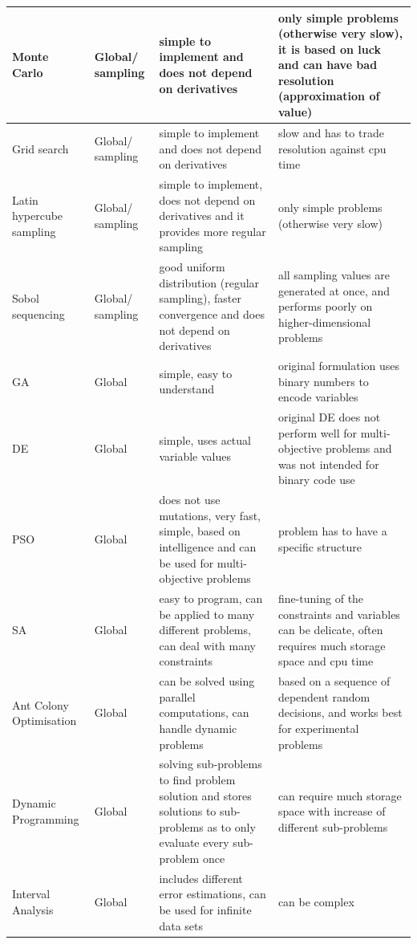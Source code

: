 \begin{longtable}{|p{2.5cm}|p{1.5cm}|p{6cm}|p{6cm}|}
Monte Carlo 	& Global/ sampling & simple to implement and does not depend on derivatives & only simple problems (otherwise very slow), it is based on luck and can have bad resolution (approximation of value) \\ \hline
Grid search 		& Global/ sampling & simple to implement and does not depend on derivatives & slow and has to trade resolution against cpu time \\ \hline
Latin hypercube sampling \cite{helton2003}		& Global/ sampling & simple to implement, does not depend on derivatives and it provides more regular sampling & only simple problems (otherwise very slow) \\ \hline
Sobol sequencing \cite{sobol1998}		& Global/ sampling & good uniform distribution (regular sampling), faster convergence and does not depend on derivatives  & all sampling values are generated at once, and performs poorly on higher-dimensional problems \\ \hline
\ac{GA}		& Global & simple, easy to understand & original formulation uses binary numbers to encode variables \\ \hline
\ac{DE} 		& Global & simple, uses actual variable values & original \ac{DE} does not perform well for multi-objective problems and was not intended for binary code use \cite{coello2007evolutionary} \\ \hline
\ac{PSO} \cite{selvi2010comparative}		& Global & does not use mutations, very fast, simple, based on intelligence and can be used for multi-objective problems  &  problem has to have a specific structure \\ \hline
\ac{SA} \cite{busetti2003simulated,ingber1993simulated} 		& Global &  easy to program, can be applied to many different problems, can deal with many constraints &  fine-tuning of the constraints and variables can be delicate, often requires much storage space and cpu time \\ \hline
Ant Colony Optimisation \cite{selvi2010comparative}	& Global & can be solved using parallel computations, can handle dynamic problems  & based on a sequence of dependent random decisions, and works best for experimental problems  \\ \hline
Dynamic Programming \cite{bhowmik2010}		& Global & solving sub-problems to find problem solution and stores solutions to sub-problems as to only evaluate every sub-problem once & can require much storage space with increase of different sub-problems \\ \hline 
Interval Analysis \cite{horst1995handbook}	& Global & includes different error estimations, can be used for infinite data sets & can be complex \\ \hline 
\end{longtable}


